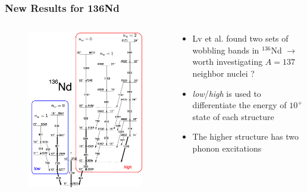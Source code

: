 \documentclass{beamer}
\begin{document}
\begin{frame}
  \frametitle{New Results for 136Nd}
  \begin{columns}
    \begin{column}{0.5\textwidth}
      \begin{figure}
        \centering
        \includegraphics[scale=0.1]{Figs/triaxial-shapes-136Nd.png}
      \end{figure}
    \end{column}
    \begin{column}{0.6\textwidth}
      \begin{itemize}
        \item Lv et al. found two sets of wobbling bands in $^{136}$Nd $\rightarrow$ worth investigating $A=137$ neighbor nuclei ?
        \item \emph{low}/\emph{high} is used to differentiate the energy of $10^+$ state of each structure
        \item The higher structure has two phonon excitations
      \end{itemize}
    \end{column}
  \end{columns}
\end{frame}
\end{document}
